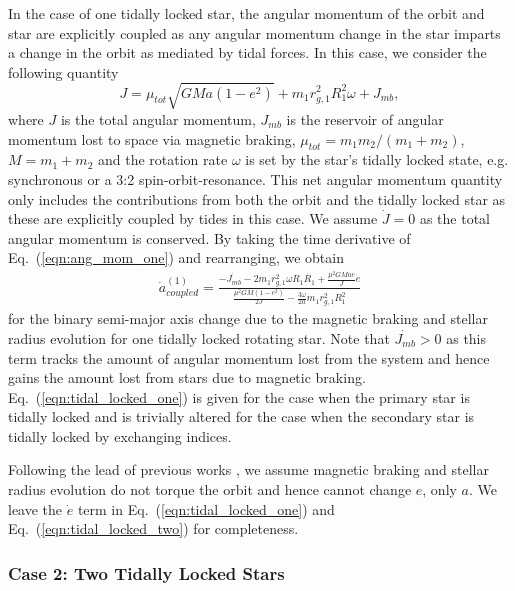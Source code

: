 In the case of one tidally locked star, the angular momentum of the orbit and star are explicitly coupled as any angular momentum change in the star imparts a change in the orbit as mediated by tidal forces.  In this case, we consider the following quantity
\begin{equation} \label{eqn:ang_mom_one}
J = \mu_{tot} \sqrt{GMa(1-e^2)} + m_1 r_{g,1}^2 R_1^2 \omega + J_{mb},
\end{equation}
where $J$ is the total angular momentum, $J_{mb}$ is the reservoir of angular momentum lost to space via magnetic braking, $\mu_{tot} = m_1 m_2 / (m_1 + m_2)$, $M = m_1 + m_2$ and the rotation rate $\omega$ is set by the star's tidally locked state, e.g. synchronous or a 3:2 spin-orbit-resonance.  This net angular momentum quantity only includes the contributions from both the orbit and the tidally locked star as these are explicitly coupled by tides in this case.  We assume $\dot{J} = 0$ as the total angular momentum is conserved.  By taking the time derivative of Eq.~(\ref{eqn:ang_mom_one}) and rearranging, we obtain
\begin{equation} \label{eqn:tidal_locked_one}
\begin{split}
\dot{a}_{coupled}^{(1)} = \frac{-\dot{J_{mb}} - 2 m_1 r_{g,1}^2 \omega R_1 \dot{R_1} + \frac{\mu^2 G M a e }{J} \dot{e}}
{\frac{\mu^2 G M (1-e^2)}{2J} - \frac{3 \omega}{2a} m_1 r_{g,1}^2 R_1^2}
\end{split}
\end{equation}
for the binary semi-major axis change due to the magnetic braking and stellar radius evolution for one tidally locked rotating star.  Note that $\dot{J_{mb}} > 0$ as this term tracks the amount of angular momentum lost from the system and hence gains the amount lost from stars due to magnetic braking.  Eq.~(\ref{eqn:tidal_locked_one}) is given for the case when the primary star is tidally locked and is trivially altered for the case when the secondary star is tidally locked by exchanging indices. 

Following the lead of previous works \citep[e.g.][]{Verbunt1981,Repetto2014}, we assume magnetic braking and stellar radius evolution do not torque the orbit and hence cannot change $e$, only $a$.  We leave the $\dot{e}$ term in Eq.~(\ref{eqn:tidal_locked_one}) and Eq.~(\ref{eqn:tidal_locked_two}) for completeness.

\subsubsection{Case 2: Two Tidally Locked Stars}

